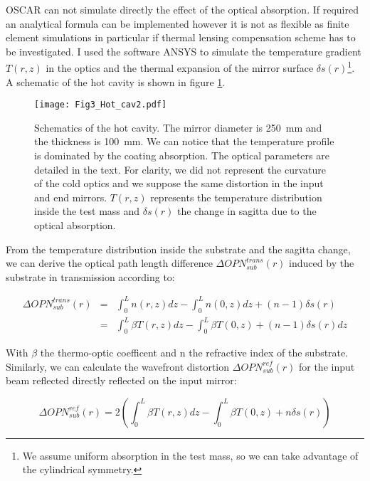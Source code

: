OSCAR can not simulate directly the effect of the optical absorption. If required an analytical formula can be implemented \cite{Hello321} however it is not as flexible as finite element simulations in particular if thermal lensing compensation scheme has to be investigated. I used the software ANSYS to simulate the temperature gradient $T(r,z)$ in the optics and the thermal expansion of the mirror surface $\delta s(r)$\footnote{We assume uniform absorption in the test mass, so we can take advantage of the cylindrical symmetry.}. A schematic of the hot cavity is shown in figure \ref{fig3:hotcav}.

\begin{figure}
\begin{center}
\texttt{[image: Fig3\_Hot\_cav2.pdf]}
\end{center}
\caption{\label{fig3:hotcav} Schematics of the hot cavity. The mirror diameter is 250~mm and the thickness is 100~mm. We can notice that the temperature profile is dominated by the coating absorption. The optical parameters are detailed in the text. For clarity, we did not represent the curvature of the cold optics and we suppose the same distortion in the input and end mirrors. $T(r,z)$ represents the temperature distribution inside the test mass and $\delta s(r)$ the change in sagitta due to the optical absorption.}
\end{figure}

From the temperature distribution inside the substrate and the sagitta change, we can derive the optical path length difference $\Delta OPN_{sub}^{trans}(r)$ induced by the substrate in transmission according to:

\begin{eqnarray}\label{eq3:OPN1}
  \Delta OPN_{sub}^{trans}(r) &=& \int_0^L n(r,z) dz - \int_0^L n(0,z) dz + (n-1)\delta s(r) \nonumber \\
                &=&  \int_0^L \beta T(r,z) dz - \int_0^L \beta T(0,z) + (n-1)\delta s(r) dz
\end{eqnarray}

With $\beta$ the thermo-optic coefficent and n the refractive index of the substrate. Similarly, we can calculate the wavefront distortion $\Delta OPN_{sub}^{ref}(r)$ for the input beam reflected directly reflected on the input mirror:

\begin{equation}\label{eq3:OPN2}
  \Delta OPN_{sub}^{ref}(r) = 2\left( \int_0^L \beta T(r,z) dz - \int_0^L \beta T(0,z) + n\delta s(r) \right)
\end{equation}

